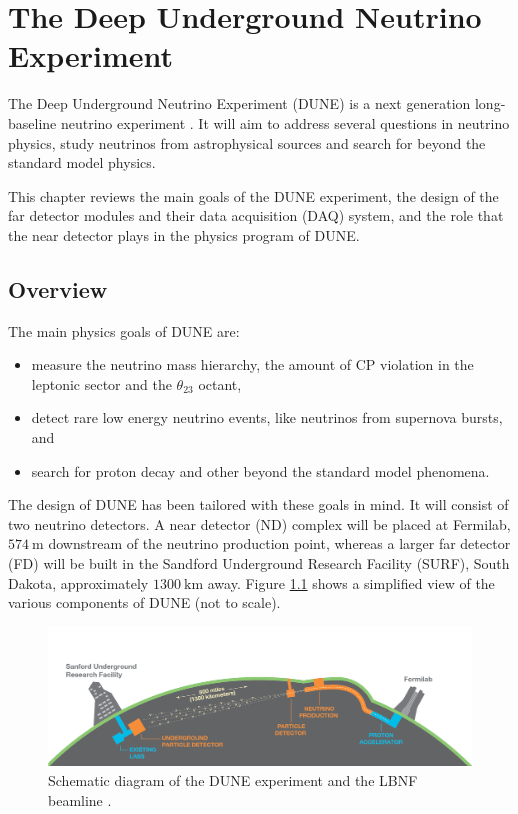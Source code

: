 \chapter{The Deep Underground Neutrino Experiment}
\label{chapter:dune}

The Deep Underground Neutrino Experiment (DUNE) is a next generation long-baseline neutrino experiment \cite{DUNE2020TDR1}.  It will aim to address several questions in neutrino physics, study neutrinos from astrophysical sources and search for beyond the standard model physics.

This chapter reviews the main goals of the DUNE experiment, the design of the far detector modules and their data acquisition (DAQ) system, and the role that the near detector plays in the physics program of DUNE.

\section{Overview}

The main physics goals of DUNE are:
\begin{itemize}
	\item measure the neutrino mass hierarchy, the amount of CP violation in the leptonic sector and the $\theta_{23}$ octant,
	\item detect rare low energy neutrino events, like neutrinos from supernova bursts, and
	\item search for proton decay and other beyond the standard model phenomena.
\end{itemize}

The design of DUNE has been tailored with these goals in mind. It will consist of two neutrino detectors. A near detector (ND) complex will be placed at Fermilab, $574~\mathrm{m}$ downstream of the neutrino production point, whereas a larger far detector (FD) will be built in the Sandford Underground Research Facility (SURF), South Dakota, approximately $1300~\mathrm{km}$ away. Figure \ref{fig:dune} shows a simplified view of the various components of DUNE (not to scale).

\begin{figure}[t]
	\centering
	\includegraphics[width=0.9\linewidth]{Images/DUNE/FD/dune}
	\caption[Schematic diagram of the DUNE experiment and the LBNF beamline.]{Schematic diagram of the DUNE experiment and the LBNF beamline \cite{DUNE2020TDR1}.}
	\label{fig:dune}
\end{figure}

